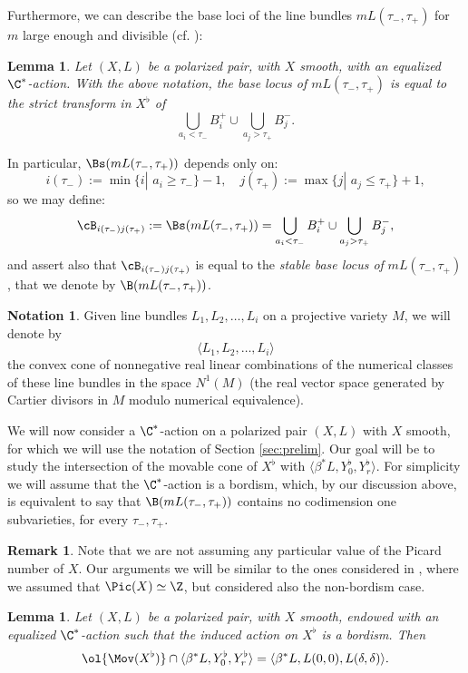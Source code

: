 \documentclass[reqno]{amsproc}
\newtheorem{lemma}[theorem]{Lemma}
\theoremstyle{definition}
\newtheorem{notation}[theorem]{Notation}
\newtheorem{remark}[theorem]{Remark}
\begin{document}
Furthermore, we can describe the base loci of the line bundles  $mL(\tau_-,\tau_+)$ for $m$ large enough and divisible (cf. \cite[Corollary~2.7]{WORS3}):
\begin{lemma}\label{lem:baselocus}
Let $(X,L)$ be a polarized pair, with $X$ smooth,  with an equalized $\C^*$-action. With the above notation, the base locus of $mL(\tau_-,\tau_+)$ is equal to the strict transform in $X^\flat$ of 
\[
\bigcup_{a_i< \tau_-}B^+_i\cup\bigcup_{a_j> \tau_+}B^-_j.
\]
\end{lemma}
In particular, $\Bs(mL(\tau_-,\tau_+))$ depends only on:
$$
i(\tau_-):=\min\{i|\,\,a_i\geq\tau_-\}-1,\quad j(\tau_+):=\max\{j|\,\,a_j\leq\tau_+\}+1,
$$
so we may define:
\[
\cB_{i(\tau_-)j(\tau_+)}:=\Bs(mL(\tau_-,\tau_+))=\bigcup_{a_i< \tau_-}B^+_i\cup\bigcup_{a_j> \tau_+}B^-_j,
\]
and assert also that $\cB_{i(\tau_-)j(\tau_+)}$ is equal to the {\em stable base locus of }$mL(\tau_-,\tau_+)$, that we denote by $\B(mL(\tau_-,\tau_+))$. 


\begin{notation}\label{not:cones}
Given line bundles $L_1,L_2,\ldots, L_i$ on a projective variety $M$, we will denote by $$\langle L_1,L_2,\dots, L_i\rangle$$ the convex cone of nonnegative real linear combinations of the numerical classes of these line bundles in the space $N^1(M)$ (the real vector space generated by Cartier divisors in $M$ modulo numerical equivalence). 
\end{notation}

We will now consider a $\C^*$-action on a polarized pair $(X,L)$ with $X$ smooth, for which we will use the notation of Section \ref{sec:prelim}. Our goal will be to study the intersection of the movable cone of $X^\flat$ with $\langle \beta^*L,Y^\flat_0,Y^\flat_r\rangle$. For simplicity we will assume that the $\C^*$-action is a bordism, which, by our discussion above, is equivalent to say that $\B(mL(\tau_-,\tau_+))$ contains no codimension one subvarieties, for every $\tau_-,\tau_+$.

\begin{remark}\label{rem:picz}
Note that we are not assuming any particular value of the Picard number of $X$. Our arguments we will be similar to the ones considered in \cite{WORS3}, where we assumed that $\Pic(X)\simeq \Z$, but considered also the non-bordism case. 
\end{remark}
 
\begin{lemma}\label{lem:movcone} Let $(X,L)$ be a polarized pair, with $X$ smooth, endowed with an equalized $\C^*$-action such that the induced action on
$X^\flat$ is a bordism. Then
\[\ol{\Mov(X^\flat)}\cap \langle \beta^* L,Y^\flat_0,Y^\flat_r\rangle= \langle \beta^*L,L(0,0),L(\delta,\delta) \rangle.\]
\end{lemma}
\end{document}
